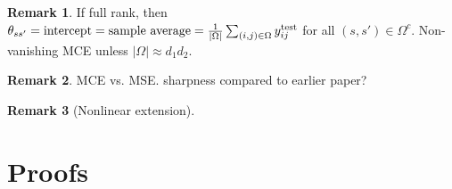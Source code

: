 \documentclass[11pt]{article}
\theoremstyle{plain}
\theoremstyle{definition}
\newtheorem{rmk}{Remark}
\begin{document}
\begin{rmk} If full rank, then $\theta_{ss'}=\text{intercept} = \text{sample average} = {1\over |\Omega|}\sum_{(i,j)\in\Omega}y^{\text{test}}_{ij}$ for all $(s,s')\in \Omega^c$. Non-vanishing MCE unless $|\Omega| \approx d_1d_2$. 
\end{rmk}

\begin{rmk} {\color{red}MCE vs. MSE. sharpness compared to earlier paper?}


\end{rmk}

\begin{rmk} [Nonlinear extension]
\end{rmk}

\section{Proofs}
\end{document}
